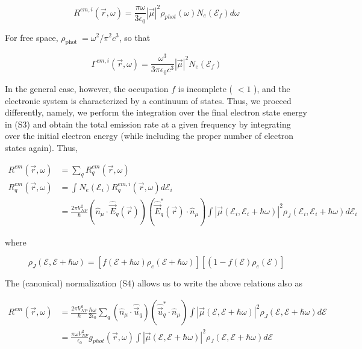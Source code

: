 \documentclass[10pt]{article}
\begin{document}
\begin{equation*}
R^{e m, i}(\vec{r}, \omega)=\frac{\pi \omega}{3 \epsilon_{0}}|\vec{\mu}|^{2} \rho_{p h o t}(\omega) N_{e}\left(\mathcal{E}_{f}\right) d \omega \tag{S5}
\end{equation*}


For free space, $\rho_{\text {phot }}=\omega^{2} / \pi^{2} c^{3}$, so that


\begin{equation*}
\Gamma^{e m, i}(\vec{r}, \omega)=\frac{\omega^{3}}{3 \pi \epsilon_{0} c^{3}}|\vec{\mu}|^{2} N_{e}\left(\mathcal{E}_{f}\right) \tag{S6}
\end{equation*}


In the general case, however, the occupation $f$ is incomplete ( $<1$ ), and the electronic system is characterized by a continuum of states. Thus, we proceed differently, namely, we perform the integration over the final electron state energy in (S3) and obtain the total emission rate at a given frequency by integrating over the initial electron energy (while including the proper number of electron states again). Thus,


\begin{align*}
R^{e m}(\vec{r}, \omega) & =\sum_{q} R_{q}^{e m}(\vec{r}, \omega)  \tag{S7}\\
R_{q}^{e m}(\vec{r}, \omega) & =\int N_{e}\left(\mathcal{E}_{i}\right) R_{q}^{e m, i}(\vec{r}, \omega) d \mathcal{E}_{i} \\
& =\frac{2 \pi V_{N P}^{2}}{\hbar}\left(\hat{n}_{\mu} \cdot \hat{\vec{E}}_{q}(\vec{r})\right)\left(\hat{\vec{E}}_{q}^{*}(\vec{r}) \cdot \hat{n}_{\mu}\right) \int\left|\vec{\mu}\left(\mathcal{E}_{i}, \mathcal{E}_{i}+\hbar \omega\right)\right|^{2} \rho_{J}\left(\mathcal{E}_{i}, \mathcal{E}_{i}+\hbar \omega\right) d \mathcal{E}_{i}
\end{align*}


where


\begin{equation*}
\rho_{J}(\mathcal{E}, \mathcal{E}+\hbar \omega)=\left[f(\mathcal{E}+\hbar \omega) \rho_{e}(\mathcal{E}+\hbar \omega)\right]\left[\left(1-f(\mathcal{E}) \rho_{e}(\mathcal{E})\right]\right. \tag{S8}
\end{equation*}


The (canonical) normalization (S4) allows us to write the above relations also as


\begin{align*}
R^{e m}(\vec{r}, \omega) & =\frac{2 \pi V_{N P}^{2}}{\hbar} \frac{\hbar \omega}{2 \epsilon_{0}} \sum_{q}\left(\hat{n}_{\mu} \cdot \hat{\vec{u}}_{q}\right)\left(\hat{\vec{u}}_{q}^{*} \cdot \hat{n}_{\mu}\right) \int|\vec{\mu}(\mathcal{E}, \mathcal{E}+\hbar \omega)|^{2} \rho_{J}(\mathcal{E}, \mathcal{E}+\hbar \omega) d \mathcal{E} \\
& =\frac{\pi \omega V_{N P}^{2}}{\epsilon_{0}} g_{p h o t}(\vec{r}, \omega) \int|\vec{\mu}(\mathcal{E}, \mathcal{E}+\hbar \omega)|^{2} \rho_{J}(\mathcal{E}, \mathcal{E}+\hbar \omega) d \mathcal{E} \tag{S9}
\end{align*}
\end{document}

